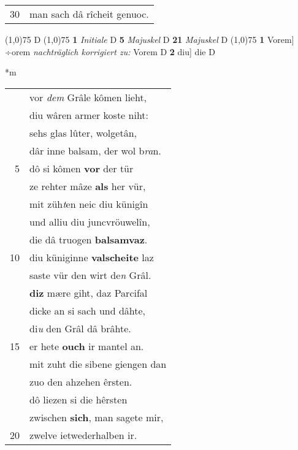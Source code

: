 \documentclass[8pt,a4paper,notitlepage]{article}
\begin{document}
\begin{table}[ht]
\begin{minipage}[t]{0.5\linewidth}
\begin{tabular}{rl}
30 & man sach dâ rîcheit genuoc.\\ 
\end{tabular}
\scriptsize
\line(1,0){75} \newline
D \newline
\line(1,0){75} \newline
\textbf{1} \textit{Initiale} D  \textbf{5} \textit{Majuskel} D  \textbf{21} \textit{Majuskel} D  \newline
\line(1,0){75} \newline
\textbf{1} Vorem] ÷orem \textit{nachträglich korrigiert zu:} Vorem D \textbf{2} diu] die D \newline
\end{minipage}
\hspace{0.5cm}
\begin{minipage}[t]{0.5\linewidth}
\small
\begin{center}*m
\end{center}
\begin{tabular}{rl}
 & vor \textit{dem} Grâle kômen lieht,\\ 
 & diu wâren armer koste niht:\\ 
 & sehs glas lûter, wolgetân,\\ 
 & dâr inne balsam, der wol b\textit{ra}n.\\ 
5 & dô si kômen \textbf{vor} der tür\\ 
 & ze rehter mâze \textbf{als} her vür,\\ 
 & mit züh\textit{t}en neic diu künigîn\\ 
 & und alliu diu juncvröuwelîn,\\ 
 & die dâ truogen \textbf{balsamvaz}.\\ 
10 & diu küniginne \textbf{valscheite} laz\\ 
 & saste vür den wirt de\textit{n} Grâl.\\ 
 & \textbf{diz} mære giht, daz Parcifal\\ 
 & dicke an si sach und dâhte,\\ 
 & di\textit{u} den Grâl dâ brâhte.\\ 
15 & er hete \textbf{ouch} ir mantel an.\\ 
 & mit zuht die sibene giengen dan\\ 
 & zuo den ahzehen êrsten.\\ 
 & dô liezen si die hêrsten\\ 
 & zwischen \textbf{sich}, man sagete mir,\\ 
20 & zwelve ietwederhalben ir.\\ 

\end{tabular}
\end{minipage}
\end{table}
\end{document}
